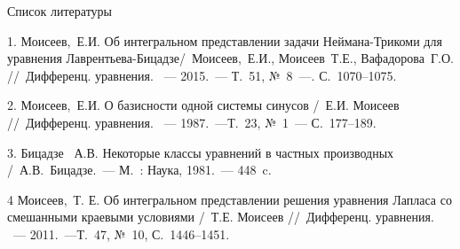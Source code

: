 \documentclass[10pt,pdf,hyperref={unicode}]{beamer}
\begin{document}
\begin{frame}{Список литературы}
			
	1. Моисеев,~Е.И. Об интегральном представлении задачи Неймана-Трикоми для уравнения Лаврентьева-Бицадзе/~Моисеев,~Е.И., Моисеев~Т.Е., Вафадорова~Г.О. //~Дифференц. уравнения. ~--- 2015.~--- Т.~51, №~8~---. С.~1070--1075.
	
	2. Моисеев,~Е.И.  О базисности одной системы синусов /~Е.И. Моисеев //~Дифференц. уравнения. ~--- 1987.~---Т.~23,  №~1~--- С.~177--189.
	
	3. Бицадзе ~А.В.  Некоторые классы уравнений в частных производных /~А.В.~Бицадзе.~--- М.~: Наука, 1981.~--- 448~c.
	
	4 Моисеев,~Т. Е.  Об интегральном представлении решения уравнения Лапласа со
	смешанными краевыми условиями /~Т.Е. Моисеев //~Дифференц. уравнения. ~--- 2011.~---Т.~47, №~10, С.~1446--1451. 
\end{frame}
\end{document}
